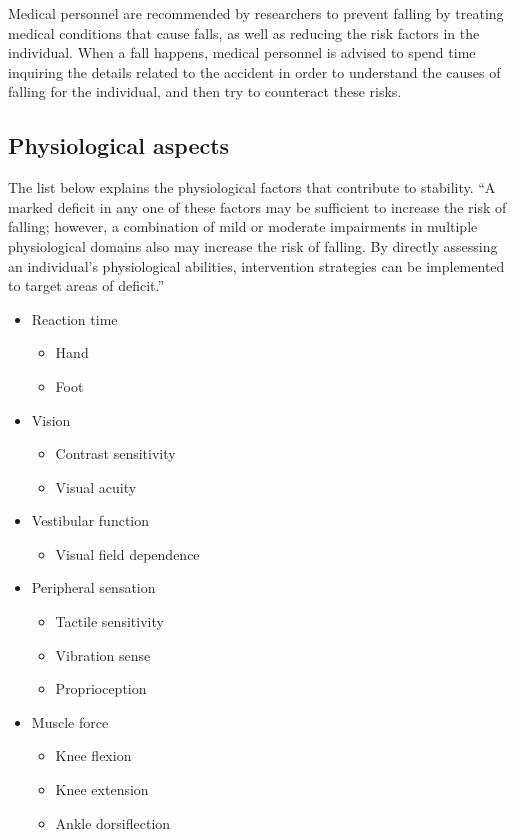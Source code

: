 Medical personnel are recommended by researchers to prevent falling by treating medical conditions that cause falls, as well as reducing the risk factors in the individual. When a fall happens, medical personnel is advised to spend time inquiring the details related to the accident in order to understand the causes of falling for the individual, and then try to counteract these risks.

\subsection{Physiological aspects}

The list below explains the physiological factors that contribute to stability. “A marked deficit in any one of these factors may be sufficient to increase the risk of falling; however, a combination of mild or moderate impairments in multiple physiological domains also may increase the risk of falling. By directly assessing an individual's physiological abilities, intervention strategies can be implemented to target areas of deficit.” \cite{LMTassessPrev}

\begin{itemize}
\item Reaction time
\begin{itemize}
\item Hand
\item Foot
\end{itemize}
\item Vision
\begin{itemize}
\item Contrast sensitivity
\item Visual acuity
\end{itemize}
\item Vestibular function
\begin{itemize}
\item Visual field dependence
\end{itemize}
\item 
Peripheral sensation
\begin{itemize}
\item Tactile sensitivity
\item Vibration sense
\item Proprioception
\end{itemize}
\item Muscle force
\begin{itemize}
\item Knee flexion
\item Knee extension
\item Ankle dorsiflection
\end{itemize}
\end{itemize}


